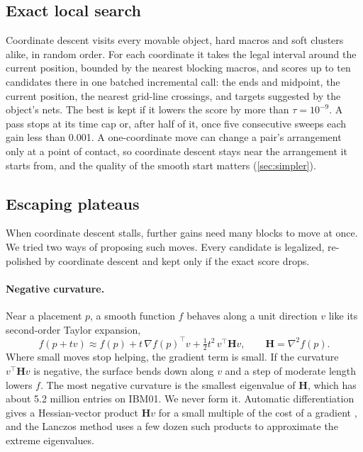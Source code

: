 \subsection{Exact local search}\label{sec:cd}

Coordinate descent \citep{wright2015coordinate} visits every movable object, hard
macros and soft clusters alike, in random order. For each coordinate it takes the
legal interval around the current position, bounded by the nearest blocking macros,
and scores up to ten candidates there in one batched incremental call: the ends and
midpoint, the current position, the nearest grid-line crossings, and targets
suggested by the object's nets. The best is kept if it lowers the score by more than
$\tau=10^{-9}$. A pass stops at its time cap or, after half of it, once five
consecutive sweeps each gain less than 0.001. A one-coordinate move can change a
pair's arrangement only at a point of contact, so coordinate descent stays near the
arrangement it starts from, and the quality of the smooth start matters
(\cref{sec:simpler}).

\subsection{Escaping plateaus}\label{sec:escape}\label{sec:curvature}\label{sec:assignment-analysis}

When coordinate descent stalls, further gains need many blocks to move at once. We
tried two ways of proposing such moves. Every candidate is legalized, re-polished by
coordinate descent and kept only if the exact score drops.

\paragraph{Negative curvature.} Near a placement $p$, a smooth function $f$ behaves
along a unit direction $v$ like its second-order Taylor expansion,
\begin{equation}
 f(p+tv)\approx f(p)+t\,\nabla f(p)^\top v+\tfrac12t^2\,v^\top \mathbf H v,
 \qquad \mathbf H=\nabla^2 f(p).
 \label{eq:taylor}
\end{equation}
Where small moves stop helping, the gradient term is small. If the curvature
$v^\top\mathbf Hv$ is negative, the surface bends down along $v$ and a step of
moderate length lowers $f$. The most negative curvature is the smallest eigenvalue of
$\mathbf H$, which has about 5.2 million entries on IBM01. We never form it.
Automatic differentiation gives a Hessian-vector product $\mathbf Hv$ for a small
multiple of the cost of a gradient \citep{pearlmutter1994hvp}, and the Lanczos method
\citep{lehoucq1998arpack} uses a few dozen such products to approximate the extreme
eigenvalues.

